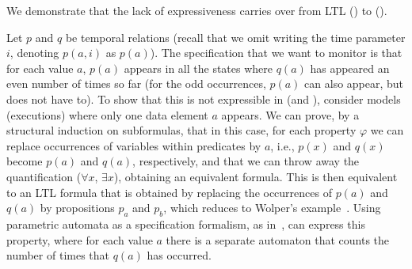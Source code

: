

We demonstrate that the lack of expressiveness
carries over from LTL (\PLTL{}) to \FLTL{} (\PFLTL{}).

\vspace{1ex}
Let $p$ and $q$ be temporal relations (recall that we omit writing the time parameter $i$, denoting $p ( a, i)$ as
$p(a)$). The
specification that we want to monitor is that for each value
$a$, $p(a)$ appears in all the states where $q(a)$ has appeared an even number of times so far (for the odd occurrences, $p(a)$ can also appear, but does not have to). To show that this is not expressible in \FLTL{} (and \PFLTL{}),
consider models (executions) where only one data element $a$ appears. We can prove, by a structural induction on subformulas,
that in this case, for each property $\varphi$
we can replace occurrences of variables within
predicates by $a$, i.e., $p(x)$ and $q(x)$ become $p(a)$
and $q  (a )$, respectively, and that we can throw away
the quantification ($\forall x$, $\exists x$), obtaining
an equivalent formula. This is then equivalent to
an LTL formula that is obtained by replacing
the occurrences of $p(a)$ and $q(a)$ by propositions
$p_a$ and $p_b$, which reduces to Wolper's example~\cite{Wolper}.
Using parametric automata as a specification formalism, as in~\cite{Grum,havelund-rv-data-2018,Meredith2011,Reger2015}, can express this property, 
where for each value $a$ there is a separate automaton that counts the number of times that $q(a)$ has occurred.

